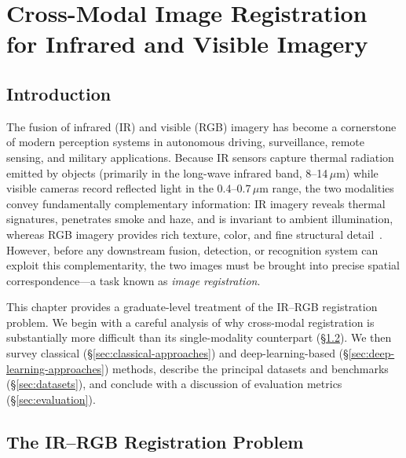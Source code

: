 
\chapter{Cross-Modal Image Registration for Infrared and Visible Imagery}
\label{ch:ir-rgb-registration}

\section{Introduction}
\label{sec:reg-intro}

The fusion of infrared (IR) and visible (RGB) imagery has become a cornerstone
of modern perception systems in autonomous driving, surveillance, remote
sensing, and military applications. Because IR sensors capture thermal radiation
emitted by objects (primarily in the long-wave infrared band, 8--14\,$\mu$m)
while visible cameras record reflected light in the 0.4--0.7\,$\mu$m range, the
two modalities convey fundamentally complementary information: IR imagery
reveals thermal signatures, penetrates smoke and haze, and is invariant to
ambient illumination, whereas RGB imagery provides rich texture, color, and
fine structural detail~\cite{ma2019infrared}. However, before any downstream
fusion, detection, or recognition system can exploit this complementarity, the
two images must be brought into precise spatial correspondence---a task known as
\emph{image registration}.

This chapter provides a graduate-level treatment of the IR--RGB registration
problem. We begin with a careful analysis of why cross-modal registration is
substantially more difficult than its single-modality counterpart
(\S\ref{sec:problem-formulation}). We then survey classical
(\S\ref{sec:classical-approaches}) and deep-learning-based
(\S\ref{sec:deep-learning-approaches}) methods, describe the principal datasets
and benchmarks (\S\ref{sec:datasets}), and conclude with a discussion of
evaluation metrics (\S\ref{sec:evaluation}).


\section{The IR--RGB Registration Problem}
\label{sec:problem-formulation}

